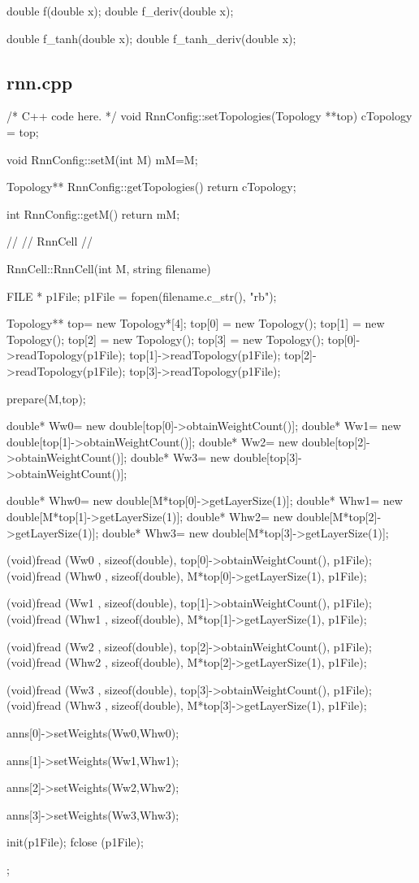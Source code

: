 double f(double x);
double f\_deriv(double x);

double f\_tanh(double x);
double f\_tanh\_deriv(double x);



\subsection{rnn.cpp}

/* C++ code here. */
void RnnConfig::setTopologies(Topology **top){
  cTopology = top;
}

void RnnConfig::setM(int M){
  mM=M;
}


Topology** RnnConfig::getTopologies(){
  return cTopology;
}

int RnnConfig::getM(){
  return mM;
}


//
// RnnCell
//

RnnCell::RnnCell(int M, string filename) {
  FILE * p1File;
  p1File = fopen(filename.c\_str(), "rb");

  Topology** top= new Topology*[4];
  top[0] = new Topology();
  top[1] = new Topology();
  top[2] = new Topology();
  top[3] = new Topology();
  top[0]->readTopology(p1File);
  top[1]->readTopology(p1File);
  top[2]->readTopology(p1File);
  top[3]->readTopology(p1File);


  prepare(M,top);

  double* Ww0= new double[top[0]->obtainWeightCount()];
  double* Ww1= new double[top[1]->obtainWeightCount()];
  double* Ww2= new double[top[2]->obtainWeightCount()];
  double* Ww3= new double[top[3]->obtainWeightCount()];

  double* Whw0= new double[M*top[0]->getLayerSize(1)];
  double* Whw1= new double[M*top[1]->getLayerSize(1)];
  double* Whw2= new double[M*top[2]->getLayerSize(1)];
  double* Whw3= new double[M*top[3]->getLayerSize(1)];

  (void)fread (Ww0 , sizeof(double), top[0]->obtainWeightCount(), p1File);
  (void)fread (Whw0 , sizeof(double), M*top[0]->getLayerSize(1), p1File);

  (void)fread (Ww1 , sizeof(double), top[1]->obtainWeightCount(), p1File);
  (void)fread (Whw1 , sizeof(double), M*top[1]->getLayerSize(1), p1File);

  (void)fread (Ww2 , sizeof(double), top[2]->obtainWeightCount(), p1File);
  (void)fread (Whw2 , sizeof(double), M*top[2]->getLayerSize(1), p1File);

  (void)fread (Ww3 , sizeof(double), top[3]->obtainWeightCount(), p1File);
  (void)fread (Whw3 , sizeof(double), M*top[3]->getLayerSize(1), p1File);


  anns[0]->setWeights(Ww0,Whw0);

  anns[1]->setWeights(Ww1,Whw1);

  anns[2]->setWeights(Ww2,Whw2);

  anns[3]->setWeights(Ww3,Whw3);



  init(p1File);
  fclose (p1File);
};



